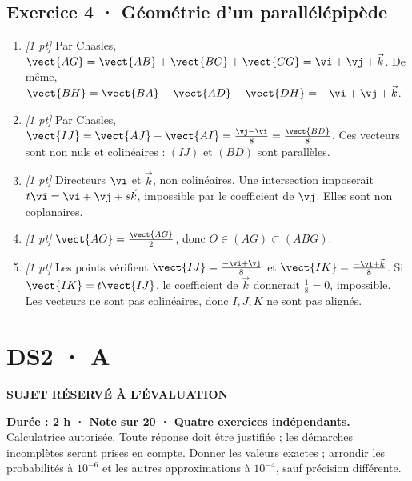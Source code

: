 \subsection*{Exercice 4 · Géométrie d'un parallélépipède}\begin{enumerate}

\item \textit{[1 pt]} Par Chasles, $\vect{AG}=\vect{AB}+\vect{BC}+\vect{CG}=\vi +\vj +\vec k$. De même, $\vect{BH}=\vect{BA}+\vect{AD}+\vect{DH}=-\vi +\vj +\vec k$.

\item \textit{[1 pt]} Par Chasles, $\vect{IJ}=\vect{AJ}-\vect{AI}=\frac{\vj -\vi }{8}=\frac{\vect{BD}}{8}$. Ces vecteurs sont non nuls et colinéaires : $(IJ)$ et $(BD)$ sont parallèles.

\item \textit{[1 pt]} Directeurs $\vi $ et $\vec k$, non colinéaires. Une intersection imposerait $t\vi =\vi +\vj +s\vec k$, impossible par le coefficient de $\vj $. Elles sont non coplanaires.

\item \textit{[1 pt]} $\vect{AO}=\frac{\vect{AG}}{2}$, donc $O\in(AG)\subset(ABG)$.

\item \textit{[1 pt]} Les points vérifient $\vect{IJ}=\frac{-\vi +\vj }{8}$ et $\vect{IK}=\frac{-\vi +\vec k}{8}$. Si $\vect{IK}=t\vect{IJ}$, le coefficient de $\vec k$ donnerait $\frac{1}{8}=0$, impossible. Les vecteurs ne sont pas colinéaires, donc $I,J,K$ ne sont pas alignés.

\end{enumerate}

\fi

\ifprof

\clearpage{}\label{sujet:2-3}

\section*{DS2 · A}

{\sffamily\bfseries\color{amber}SUJET RÉSERVÉ À L'ÉVALUATION\par}

\textbf{Durée : 2 h · Note sur 20 · Quatre exercices indépendants.}\\Calculatrice autorisée. Toute réponse doit être justifiée ; les démarches incomplètes seront prises en compte. Donner les valeurs exactes ; arrondir les probabilités à $10^{-6}$ et les autres approximations à $10^{-4}$, sauf précision différente.

